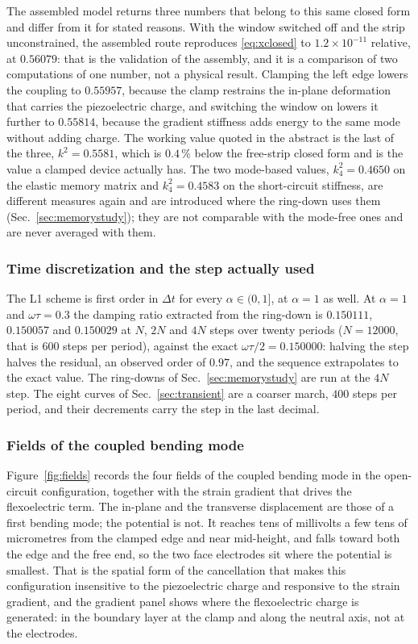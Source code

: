The assembled model returns three numbers that belong to this same closed
form and differ from it for stated reasons. With the window switched off and
the strip unconstrained, the assembled route reproduces \eqref{eq:xclosed} to
$1.2\times10^{-11}$ relative, at $0.56079$: that is the validation of the
assembly, and it is a comparison of two computations of one number, not a
physical result. Clamping the left edge lowers the coupling to $0.55957$,
because the clamp restrains the in-plane deformation that carries the
piezoelectric charge, and switching the window on lowers it further to
$0.55814$, because the gradient stiffness adds energy to the same mode without
adding charge. The working value quoted in the abstract is the last of the
three, $k^{2}=0.5581$, which is $0.4\,\%$ below the free-strip closed form and
is the value a clamped device actually has. The two mode-based values,
$k^2_4=0.4650$ on the elastic memory matrix and $k^2_4=0.4583$ on the
short-circuit stiffness, are different measures again and are introduced where
the ring-down uses them (Sec.~\ref{sec:memorystudy}); they are not comparable
with the mode-free ones and are never averaged with them.

\subsubsection{Time discretization and the step actually used}

The L1 scheme is first order in $\Delta t$ for every $\alpha\in(0,1]$, at
$\alpha=1$ as well. At $\alpha=1$ and $\omega\tau=0.3$ the damping ratio
extracted from the ring-down is $0.150111$, $0.150057$ and $0.150029$ at $N$,
$2N$ and $4N$ steps over twenty periods ($N=12000$, that is $600$ steps per
period), against the exact $\omega\tau/2=0.150000$: halving the step halves the
residual, an observed order of $0.97$, and the sequence extrapolates to the
exact value. The ring-downs of Sec.~\ref{sec:memorystudy} are run at the $4N$
step. The eight curves of Sec.~\ref{sec:transient} are a coarser march, $400$
steps per period, and their decrements carry the step in the last decimal.

\subsubsection{Fields of the coupled bending mode}

Figure~\ref{fig:fields} records the four fields of the coupled bending mode in
the open-circuit configuration, together with the strain gradient that drives
the flexoelectric term. The in-plane and the transverse displacement are those
of a first bending mode; the potential is not. It reaches tens of millivolts a
few tens of micrometres from the clamped edge and near mid-height, and falls
toward both the edge and the free end, so the two face electrodes sit where the
potential is smallest. That is the spatial form of the cancellation that makes
this configuration insensitive to the piezoelectric charge and responsive to
the strain gradient, and the gradient panel shows where the flexoelectric
charge is generated: in the boundary layer at the clamp and along the neutral
axis, not at the electrodes.


